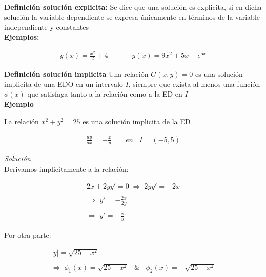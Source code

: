 \textbf{Definición solución explicita:} Se dice que una solución es explicita, si en dicha solución la variable dependiente se expresa únicamente en términos de la variable independiente y constantes\\

\textbf{Ejemplos:}

\begin{equation*}
    \begin{gathered}
        y(x)=\frac{x^{2}}{2}+4\;\;\;\;\;\;\;\;\;\;\;\;y(x)=9x^{2}+5x+e^{5x}
    \end{gathered}
\end{equation*}


\textbf{Definición solución implicita} Una relación \(\displaystyle G(x,y)=0\) es una solución implicita de una EDO en un intervalo \(\displaystyle I\), siempre que exista al menos una función \(\displaystyle\phi(x)\) que satisfaga tanto a la relación como  a la ED en \(\displaystyle I\)\\

\textbf{Ejemplo}

La relación \(\displaystyle x^{2}+y^{2}=25\) es una solución implicita de la ED

\begin{equation}
    \begin{gathered}
        \frac{dy}{dx}=-\frac{x}{y}\;\;\;\;\;\;\;en\;\;\;I=(-5,5)
    \end{gathered}
\end{equation}

\textit{Solución}\\

Derivamos implicitamente a la relación:

\begin{equation*}
    \begin{gathered}
        2x+2yy'=0 \;\Rightarrow\; 2yy'=-2x \\\\
        \Rightarrow\; y'=-\frac{2x}{2y}\\\\
        \Rightarrow\; y'=-\frac{x}{y}
    \end{gathered}
\end{equation*}

Por otra parte:

\begin{equation*}
    \begin{gathered}
        \left|y\right|=\sqrt{25-x^{2}}\\\\
        \Rightarrow\;\phi_{1}(x)=\sqrt{25-x^{2}}\;\;\;\&\;\;\;\phi_{2}(x)=-\sqrt{25-x^{2}}
    \end{gathered}
\end{equation*}

